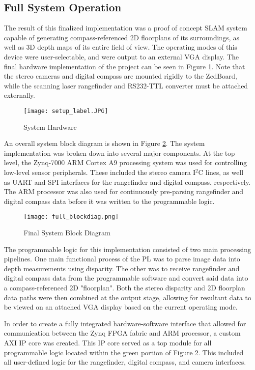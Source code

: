 \subsection{Full System Operation}
The result of this finalized implementation was a proof of concept SLAM system capable of generating compass-referenced 2D floorplans of its surroundings, as well as 3D depth maps of its entire field of view. The operating modes of this device were user-selectable, and were output to an external VGA display. The final hardware implementation of the project can be seen in Figure \ref{finalHW}. Note that the stereo cameras and digital compass are mounted rigidly to the ZedBoard, while the scanning laser rangefinder and RS232-TTL converter must be attached externally.
\par
\begin{figure}[H] 
	\centerline{
	\texttt{[image: setup\_label.JPG]}
	}
	\caption{System Hardware}
	\label{finalHW}
\end{figure}
\par
An overall system block diagram is shown in Figure \ref{systemBD2}. The system implementation was broken down into several major components. At the top level, the Zynq-7000 ARM Cortex A9 processing system was used for controlling low-level sensor peripherals. These included the stereo camera I$^2$C lines, as well as UART and SPI interfaces for the rangefinder and digital compass, respectively. The ARM processor was also used for continuously pre-parsing rangefinder and digital compass data before it was written to the programmable logic.
\par
\begin{figure}[H]
	\centerline{
	\texttt{[image: full\_blockdiag.png]}
	}
	\caption{Final System Block Diagram}
	\label{systemBD2}
\end{figure}
\par
The programmable logic for this implementation consisted of two main processing pipelines. One main functional process of the PL was to parse image data into depth measurements using disparity. The other was to receive rangefinder and digital compass data from the programmable software and convert said data into a compass-referenced 2D "floorplan". Both the stereo disparity and 2D floorplan data paths were then combined at the output stage, allowing for resultant data to be viewed on an attached VGA display based on the current operating mode.
\par
In order to create a fully integrated hardware-software interface that allowed for communication between the Zynq FPGA fabric and ARM processor, a custom AXI IP core was created. This IP core served as a top module for all programmable logic located within the green portion of Figure \ref{systemBD2}. This included all user-defined logic for the rangefinder, digital compass, and camera interfaces.
